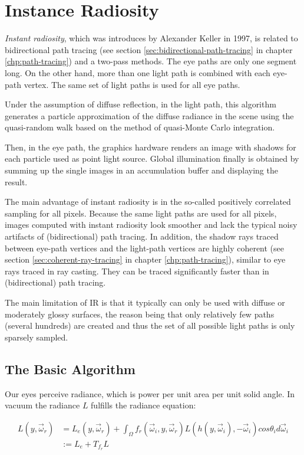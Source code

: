\chapter{Instance Radiosity}\label{chp:instant-radiosity}
\textit{Instant radiosity}\cite{a:InstantRadiosity}, which was introduces by Alexander Keller in 1997, is related to bidirectional path tracing (see section \ref{sec:bidirectional-path-tracing} in chapter \ref{chp:path-tracing}) and a two-pass methods. The eye paths are only one segment long. On the other hand, more than one light path is combined with each eye-path vertex. The same set of light paths is used for all eye paths.

Under the assumption of diffuse reflection, in the light path, this algorithm generates a particle approximation of the diffuse radiance in the scene using the quasi-random walk based on the method of quasi-Monte Carlo integration. 

Then, in the eye path, the graphics hardware renders an image with shadows for each particle used as point light source. Global illumination finally is obtained by summing up the single images in an accumulation buffer and displaying the result.

The main advantage of instant radiosity is in the so-called positively correlated sampling for all pixels. Because the same light paths are used for all pixels, images computed with instant radiosity look smoother and lack the typical noisy artifacts of (bidirectional) path tracing. In addition, the shadow rays traced between eye-path vertices and the light-path vertices are highly coherent (see section \ref{sec:coherent-ray-tracing} in chapter \ref{chp:path-tracing}), similar to eye rays traced in ray casting. They can be traced significantly faster than in (bidirectional) path tracing.

The main limitation of IR is that it typically can only be used with diffuse or moderately glossy surfaces, the reason being that only relatively few paths (several hundreds) are created and thus the set of all possible light paths is only sparsely sampled.




\section{The Basic Algorithm}
Our eyes perceive radiance, which is power per unit area per unit solid angle. In vacuum the radiance $L$ fulfills the radiance equation:

\begin{equation*}
\begin{aligned}
	L(y,\vec{\omega}_r)&=L_e(y,\vec{\omega}_r)+\int_\Omega f_r(\vec{\omega}_i,y,\vec{\omega}_r)L(h(y,\vec{\omega}_i),-\vec{\omega}_i)cos\theta_id\vec{\omega}_i\\
	&:=L_e+T_{f_r}L
\end{aligned}
\end{equation*}

